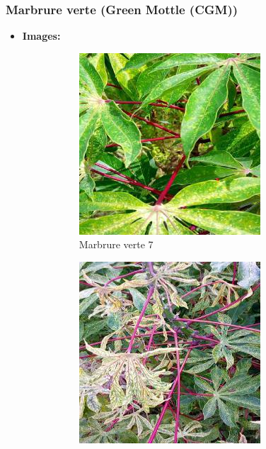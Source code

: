 \documentclass{article}
\begin{document}
	\newpage

	\subsubsection{Marbrure verte (Green Mottle (CGM))}
	\begin{itemize}
		\item \textbf{Images: }
		\begin{figure}[htbp]
			\centering
			\begin{subfigure}[b]{0.3\textwidth}
				\centering
				\includegraphics[width=\textwidth]{img/7.jpg}
				\caption{Marbrure verte 7}
			\end{subfigure}
			\hfill
			\begin{subfigure}[b]{0.3\textwidth}
				\centering
				\includegraphics[width=\textwidth]{img/8.jpg}

\end{subfigure}
\end{figure}
\end{itemize}
\end{document}
